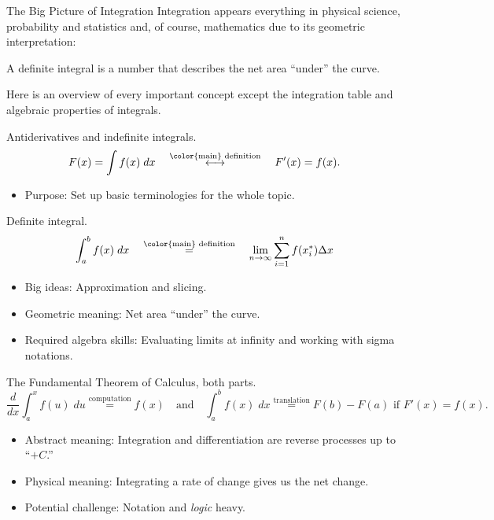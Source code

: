 \documentclass[../main.tex]{subfiles}
\begin{document}
\begin{lesson}{The Big Picture of Integration}
  Integration appears everything in physical science, probability and statistics and, of course, mathematics due to its geometric interpretation:

  \medskip
  \begin{mdframed}[style=simple]
    \centering
    \color{main}
    A definite integral is a number that describes the net area ``under'' the curve.
  \end{mdframed}

  Here is an overview of every important concept except the integration table and algebraic properties of integrals.
  \begin{description}[itemsep=2ex]
    \item[Terminologies.] Antiderivatives and indefinite integrals.
      \[
        F(x) = \int f(x) \;dx \quad\overset{\text{\color{main} definition}}{\longleftrightarrow}\quad F'(x) = f(x).
      \]        
      \begin{itemize}
        \item Purpose: Set up basic terminologies for the whole topic.
      \end{itemize}

    \item[Concept.] Definite integral.
      \[
        \int_{a}^{b} f(x) \; dx \quad\overset{\text{\color{main} definition}}{=}\quad \lim_{n \to \infty} \sum_{i=1}^{n} f(x_{i}^{*}) {\Delta x}
      \]

      \begin{itemize}
        \item Big ideas: Approximation and slicing.
        \item Geometric meaning: Net area ``under'' the curve.
        \item Required algebra skills: Evaluating limits at infinity and working with sigma notations.
      \end{itemize}

    \item[Theorem.] The Fundamental Theorem of Calculus, both parts. 
      \[
        \frac{d}{dx} \int_{a}^{x} f(u) \;du \overset{\text{computation}}{=} f(x) \quad\text{and}\quad \int_{a}^{b} f(x) \;dx \overset{\text{translation}}{=} F(b) - F(a) \text{ if } F'(x) = f(x).
      \]
      \begin{itemize}
        \item Abstract meaning: Integration and differentiation are reverse processes up to ``\(+C\).''
        \item Physical meaning: Integrating a rate of change gives us the net change.
        \item Potential challenge: Notation and \emph{logic} heavy.
      \end{itemize}


\end{description}
\end{lesson}
\end{document}
